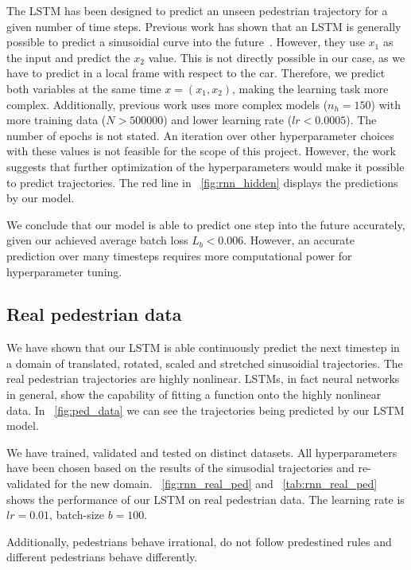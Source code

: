 The LSTM has been designed to predict an unseen pedestrian trajectory for a given number of time steps.
Previous work has shown that an LSTM is generally possible to predict a sinusoidial curve into the future~\cite{sunsided}.
However, they use $x_1$ as the input and predict the $x_2$ value.
This is not directly possible in our case, as we have to predict in a local frame with respect to the car.
Therefore, we predict both variables at the same time $x = (x_1, x_2)$, making the learning task more complex.
Additionally, previous work uses more complex models ($n_h=150$) with more training data ($N>500000$) and lower learning rate ($lr<0.0005$).
The number of epochs is not stated.
An iteration over other hyperparameter choices with these values is not feasible for the scope of this project.
However, the work suggests that further optimization of the hyperparameters would make it possible to predict trajectories.
The red line in ~\cref{fig:rnn_hidden} displays the predictions by our model. 

We conclude that our model is able to predict one step into the future accurately, given our achieved average batch loss $L_b<0.006$.
However, an accurate prediction over many timesteps requires more computational power for hyperparameter tuning. 

\subsection{Real pedestrian data}

We have shown that our LSTM is able continuously predict the next timestep in a domain of translated, rotated, scaled and stretched sinusoidial trajectories. The real pedestrian trajectories are highly nonlinear. LSTMs, in fact neural networks in general, show the capability of fitting a function onto the highly nonlinear data. In ~\cref{fig:ped_data} we can see the trajectories being predicted by our LSTM model.

We have trained, validated and tested on distinct datasets. All hyperparameters have been chosen based on the results of the sinusodial trajectories and re-validated for the new domain. ~\cref{fig:rnn_real_ped} and ~\cref{tab:rnn_real_ped} shows the performance of our LSTM on real pedestrian data. The learning rate is $lr=0.01$, batch-size $b=100$. 

Additionally, pedestrians behave irrational, do not follow predestined rules and different pedestrians behave differently. 

